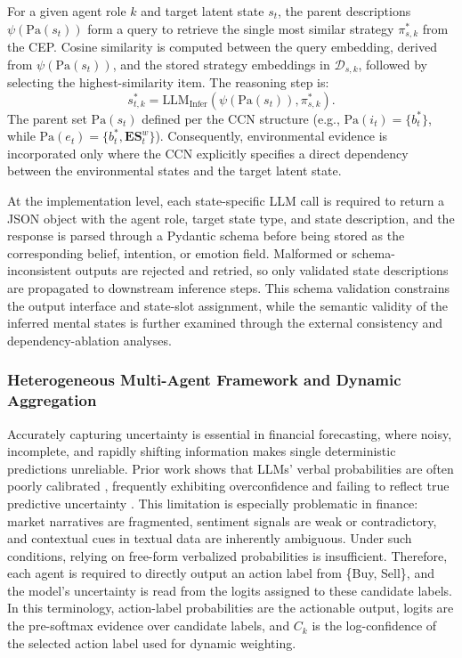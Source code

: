 \documentclass[a4paper,fleqn,doubleblind]{cas-sc}
\newcommand{\revise}[1]{{\color{blue}#1}}
\begin{document}
For a given agent role $k$ and target latent state $s_t$, the parent descriptions $\psi(\text{Pa}(s_t))$ form a query to retrieve the single most similar strategy $\pi_{s,k}^*$ from the CEP. Cosine similarity is computed between the query embedding, derived from $\psi(\text{Pa}(s_t))$, and the stored strategy embeddings in $\mathcal{D}_{s,k}$, followed by selecting the highest-similarity item. The reasoning step is:
\begin{equation}
s_{t,k}^* = \text{LLM}_{\text{Infer}}(\psi(\text{Pa}(s_t)), \pi_{s,k}^*)
\label{eq:state_inference}.
\end{equation}
The parent set $\text{Pa}(s_t)$ defined per the CCN structure (e.g., $\text{Pa}(i_t) = \{b_t^*\}$, while $\text{Pa}(e_t) = \{b_t^*, \mathbf{ES}_t^w\}$). Consequently, environmental evidence is incorporated only where the CCN explicitly specifies a direct dependency between the environmental states and the target latent state.

\revise{At the implementation level, each state-specific LLM call is required to return a JSON object with the agent role, target state type, and state description, and the response is parsed through a Pydantic schema before being stored as the corresponding belief, intention, or emotion field. Malformed or schema-inconsistent outputs are rejected and retried, so only validated state descriptions are propagated to downstream inference steps. This schema validation constrains the output interface and state-slot assignment, while the semantic validity of the inferred mental states is further examined through the external consistency and dependency-ablation analyses.}


\subsubsection{Heterogeneous Multi-Agent Framework and Dynamic Aggregation}
Accurately capturing uncertainty is essential in financial forecasting, where noisy, incomplete, and rapidly shifting information makes single deterministic predictions unreliable. Prior work shows that LLMs’ verbal probabilities are often poorly calibrated \citep{ma2025estimating}, frequently exhibiting overconfidence \citep{xiong2024can, kadavath2022language} and failing to reflect true predictive uncertainty \citep{feng2025bird}. This limitation is especially problematic in finance: market narratives are fragmented, sentiment signals are weak or contradictory, and contextual cues in textual data are inherently ambiguous. Under such conditions, relying on free-form verbalized probabilities is insufficient. Therefore, each agent is required to directly output an action label from \{Buy, Sell\}, and the model’s uncertainty is read from the logits assigned to these candidate labels. In this terminology, action-label probabilities are the actionable output, logits are the pre-softmax evidence over candidate labels, and $C_k$ is the log-confidence of the selected action label used for dynamic weighting.
\end{document}

